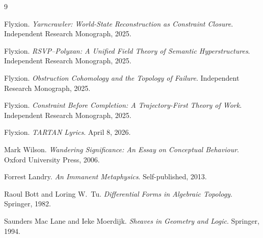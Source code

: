 \documentclass[12pt, a4paper]{article}
\begin{document}
\begin{thebibliography}{9}

Flyxion. \textit{Yarncrawler: World-State Reconstruction as Constraint Closure}. Independent Research Monograph, 2025.

Flyxion. \textit{RSVP--Polyxan: A Unified Field Theory of Semantic Hyperstructures}. Independent Research Monograph, 2025.

Flyxion. \textit{Obstruction Cohomology and the Topology of Failure}. Independent Research Monograph, 2025.

Flyxion. \textit{Constraint Before Completion: A Trajectory-First Theory of Work}. Independent Research Monograph, 2025.

Flyxion. \textit{TARTAN Lyrics}. April 8, 2026.

Mark Wilson. \textit{Wandering Significance: An Essay on Conceptual Behaviour}. Oxford University Press, 2006.

Forrest Landry. \textit{An Immanent Metaphysics}. Self-published, 2013.

Raoul Bott and Loring W.\ Tu. \textit{Differential Forms in Algebraic Topology}. Springer, 1982.

Saunders Mac Lane and Ieke Moerdijk. \textit{Sheaves in Geometry and Logic}. Springer, 1994.

\end{thebibliography}
\end{document}
